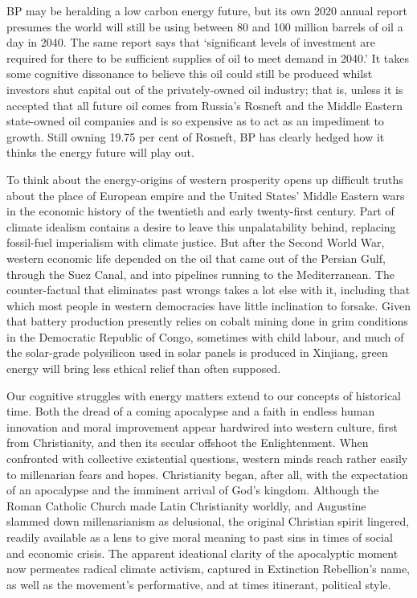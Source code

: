 \documentclass[
]{book}
\begin{document}
BP may be heralding a low carbon energy future, but its own 2020 annual report presumes the world will still be using between 80 and 100 million barrels of oil a day in 2040. The same report says that `significant levels of investment are required for there to be sufficient supplies of oil to meet demand in 2040.' It takes some cognitive dissonance to believe this oil could still be produced whilst investors shut capital out of the privately-owned oil industry; that is, unless it is accepted that all future oil comes from Russia's Rosneft and the Middle Eastern state-owned oil companies and is so expensive as to act as an impediment to growth. Still owning 19.75 per cent of Rosneft, BP has clearly hedged how it thinks the energy future will play out.

To think about the energy-origins of western prosperity opens up difficult truths about the place of European empire and the United States' Middle Eastern wars in the economic history of the twentieth and early twenty-first century. Part of climate idealism contains a desire to leave this unpalatability behind, replacing fossil-fuel imperialism with climate justice. But after the Second World War, western economic life depended on the oil that came out of the Persian Gulf, through the Suez Canal, and into pipelines running to the Mediterranean. The counter-factual that eliminates past wrongs takes a lot else with it, including that which most people in western democracies have little inclination to forsake. Given that battery production presently relies on cobalt mining done in grim conditions in the Democratic Republic of Congo, sometimes with child labour, and much of the solar-grade polysilicon used in solar panels is produced in Xinjiang, green energy will bring less ethical relief than often supposed.

Our cognitive struggles with energy matters extend to our concepts of historical time. Both the dread of a coming apocalypse and a faith in endless human innovation and moral improvement appear hardwired into western culture, first from Christianity, and then its secular offshoot the Enlightenment. When confronted with collective existential questions, western minds reach rather easily to millenarian fears and hopes. Christianity began, after all, with the expectation of an apocalypse and the imminent arrival of God's kingdom. Although the Roman Catholic Church made Latin Christianity worldly, and Augustine slammed down millenarianism as delusional, the original Christian spirit lingered, readily available as a lens to give moral meaning to past sins in times of social and economic crisis. The apparent ideational clarity of the apocalyptic moment now permeates radical climate activism, captured in Extinction Rebellion's name, as well as the movement's performative, and at times itinerant, political style.
\end{document}

